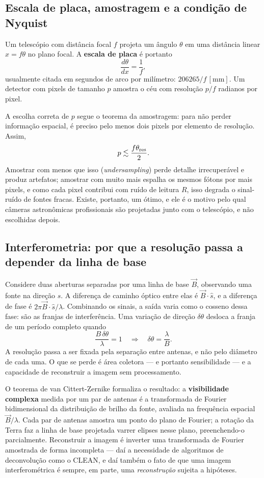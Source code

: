 \documentclass[11pt,a4paper]{article}
\begin{document}
\subsection*{Escala de placa, amostragem e a condição de Nyquist}

Um telescópio com distância focal $f$ projeta um ângulo $\theta$ em uma distância linear $x=f\theta$ no plano focal. A \textbf{escala de placa} é portanto
\[
\frac{d\theta}{dx}=\frac{1}{f},
\]
usualmente citada em segundos de arco por milímetro: $206265/f\,[\mathrm{mm}]$. Um detector com pixels de tamanho $p$ amostra o céu com resolução $p/f$ radianos por pixel.

A escolha correta de $p$ segue o teorema da amostragem: para não perder informação espacial, é preciso pelo menos dois pixels por elemento de resolução. Assim,
\[
p\lesssim\frac{f\theta_{\rm res}}{2}.
\]
Amostrar com menos que isso (\textit{undersampling}) perde detalhe irrecuperável e produz artefatos; amostrar com muito mais espalha os mesmos fótons por mais pixels, e como cada pixel contribui com ruído de leitura $R$, isso degrada o sinal-ruído de fontes fracas. Existe, portanto, um ótimo, e ele é o motivo pelo qual câmeras astronômicas profissionais são projetadas junto com o telescópio, e não escolhidas depois.

\subsection*{Interferometria: por que a resolução passa a depender da linha de base}

Considere duas aberturas separadas por uma linha de base $\vec{B}$, observando uma fonte na direção $\hat{s}$. A diferença de caminho óptico entre elas é $\vec{B}\cdot\hat{s}$, e a diferença de fase é $2\pi\vec{B}\cdot\hat{s}/\lambda$. Combinando os sinais, a saída varia como o cosseno dessa fase: são as franjas de interferência. Uma variação de direção $\delta\theta$ desloca a franja de um período completo quando
\[
\frac{B\,\delta\theta}{\lambda}=1
\quad\Longrightarrow\quad
\delta\theta=\frac{\lambda}{B}.
\]
A resolução passa a ser fixada pela separação entre antenas, e não pelo diâmetro de cada uma. O que se perde é área coletora --- e portanto sensibilidade --- e a capacidade de reconstruir a imagem sem processamento.

O teorema de van Cittert-Zernike formaliza o resultado: a \textbf{visibilidade complexa} medida por um par de antenas é a transformada de Fourier bidimensional da distribuição de brilho da fonte, avaliada na frequência espacial $\vec{B}/\lambda$. Cada par de antenas amostra um ponto do plano de Fourier; a rotação da Terra faz a linha de base projetada varrer elipses nesse plano, preenchendo-o parcialmente. Reconstruir a imagem é inverter uma transformada de Fourier amostrada de forma incompleta --- daí a necessidade de algoritmos de deconvolução como o CLEAN, e daí também o fato de que uma imagem interferométrica é sempre, em parte, uma \emph{reconstrução} sujeita a hipóteses.
\end{document}
